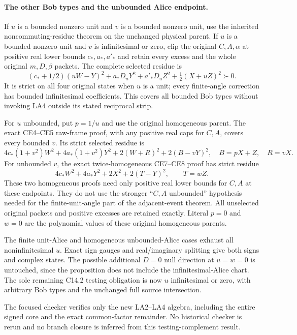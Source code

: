 \paragraph{The other Bob types and the unbounded Alice endpoint.}
If $u$ is a bounded nonzero unit and $v$ is a bounded nonzero unit,
use the inherited noncommuting-residue theorem on the unchanged
physical parent.  If $u$ is a bounded nonzero unit and $v$ is
infinitesimal or zero, clip the original $C,A,\alpha$ at positive
real lower bounds $c_*,a_*,a'_*$ and retain every excess and the
whole original $m,D,\beta$ packets.  The complete selected residue is
\[
 (c_*+1/2)(uW-Y)^2+a_*D_uY^2
          +a'_*D_uZ^2+\tfrac12(X+uZ)^2\succ0.     \tag{LA5}
\]
It is strict on all four original states when $u$ is a unit; every
finite-angle correction has bounded infinitesimal coefficients.
This covers all bounded Bob types without invoking LA4 outside its
stated reciprocal strip.

For $u$ unbounded, put $p=1/u$ and use the original homogeneous
parent.  The exact CE4--CE5 raw-frame proof, with any positive real
caps for $C,A$, covers every bounded $v$.  Its strict selected
residue is
\[
 4c_*(1+v^2)W^2+4a_*(1+v^2)Y^2
                      +2(W+R)^2+2(B-vY)^2,
 \quad B=pX+Z,\quad R=vX.                         \tag{LA6}
\]
For unbounded $v$, the exact twice-homogeneous CE7--CE8 proof has
strict residue
\[
 4c_*W^2+4a_*Y^2+2X^2+2(T-Y)^2,
 \qquad T=wZ.                                    \tag{LA7}
\]
These two homogeneous proofs need only positive real lower bounds
for $C,A$ at these endpoints.  They do not use the stronger
``$C,A$ unbounded'' hypothesis needed for the finite-unit-angle part
of the adjacent-event theorem.  All unselected original packets and
positive excesses are retained exactly.  Literal $p=0$ and $w=0$
are the polynomial values of these original homogeneous parents.

The finite unit-Alice and homogeneous unbounded-Alice cases exhaust
all noninfinitesimal $u$.  Exact sign gauges and real/imaginary splitting
give both signs and complex states.  The possible additional $D=0$
null direction at $u=w=0$ is untouched, since the proposition does
not include the infinitesimal-Alice chart.  The sole remaining C14.2
testing obligation is now $u$ infinitesimal or zero, with arbitrary
Bob types and the unchanged full source intersection.

The focused checker verifies only the new LA2--LA4 algebra, including
the entire signed core and the exact common-factor remainder.  No
historical checker is rerun and no branch closure is inferred from
this testing-complement result.
